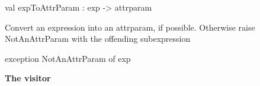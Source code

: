 \documentclass[11pt]{article}
\begin{document}
\label{val:Cil.expToAttrParam}\begin{ocamldoccode}
val expToAttrParam : exp -> attrparam
\end{ocamldoccode}
\begin{ocamldocdescription}
Convert an expression into an attrparam, if possible. Otherwise raise
    NotAnAttrParam with the offending subexpression


\end{ocamldocdescription}




\label{exception:Cil.NotAnAttrParam}\begin{ocamldoccode}
exception NotAnAttrParam of exp
\end{ocamldoccode}




{\bf The visitor}
\end{document}
